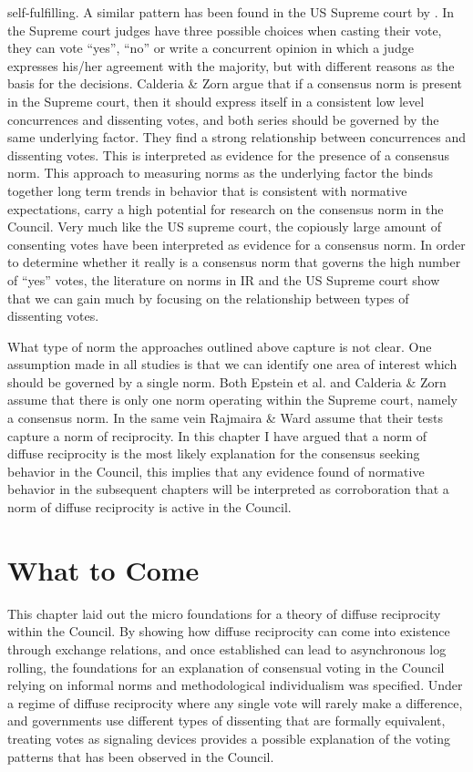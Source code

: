 self-fulfilling. A similar pattern has been found in the US Supreme court by \citet{CalderiaZorn1998}. In the Supreme court judges have three possible choices when casting their vote, they can vote ``yes'', ``no'' or write a concurrent opinion in which a judge expresses his/her agreement with the majority, but with different reasons as the basis for the decisions. Calderia \& Zorn argue that if a consensus norm is present in the Supreme court, then it should express itself in a consistent low level concurrences and dissenting votes, and both series should be governed by the same underlying factor. They find a strong relationship between concurrences and dissenting votes. This is interpreted as evidence for the presence of a consensus norm. This approach to measuring norms as the underlying factor the binds together long term trends in behavior that is consistent with normative expectations, carry a high potential for research on the consensus norm in the Council. Very much like the US supreme court, the copiously large amount of consenting votes have been interpreted as evidence for a consensus norm. In order to determine whether it really is a consensus norm that governs the high number of ``yes'' votes, the literature on norms in IR and the US Supreme court show that we can gain much by focusing on the relationship between types of dissenting votes. 

What type of norm the approaches outlined above capture is not clear. One assumption made in all studies is that we can identify one area of interest which should be governed by a single norm. Both Epstein et al. and Calderia \& Zorn assume that there is only one norm operating within the Supreme court, namely a consensus norm. In the same vein Rajmaira \& Ward assume that their tests capture a norm of reciprocity. In this chapter I have argued that a norm of diffuse reciprocity is the most likely explanation for the consensus seeking behavior in the Council,  this implies that any evidence found of normative behavior in the subsequent chapters will be interpreted as corroboration that a norm of diffuse reciprocity is active in the Council. 

\section{What to Come}
This chapter laid out the micro foundations for a theory of diffuse reciprocity within the Council. By showing how diffuse reciprocity can come into existence through exchange relations, and once established can lead to asynchronous log rolling, the foundations for an explanation of consensual voting in the Council relying on informal norms and methodological individualism was specified. Under a regime of diffuse reciprocity where any single vote will rarely make a difference, and governments use different types of dissenting that are formally equivalent, treating votes as signaling devices provides a possible explanation of the voting patterns that has been observed in the Council.  

